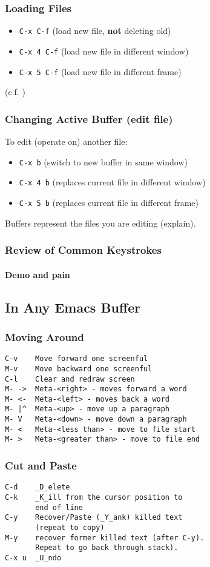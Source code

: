 \documentclass{beamer}
\begin{document}
\begin{frame}[fragile]
  \frametitle{Loading Files}
  \label{keystrokes:fileloading}
  \begin{itemize}
  \item \verb+C-x C-f+    (load new file, \textbf{not} deleting old)
  \item \verb+C-x 4 C-f+  (load new file in different window)
  \item \verb+C-x 5 C-f+  (load new file in different frame)
  \end{itemize}
  (c.f. \hyperlink{emacs:basics}{})
\end{frame}

\begin{frame}[fragile]
  \frametitle{Changing Active Buffer (edit file)}
  To edit (operate on) another file:
  \begin{itemize}
  \item \verb+C-x b+    (switch to new buffer in same window)
  \item \verb+C-x 4 b+  (replaces current file in different window)
  \item \verb+C-x 5 b+  (replaces current file in different frame)
  \end{itemize}
  Buffers represent the files you are editing (explain).
\end{frame}

\begin{frame}
  \frametitle{Review of Common Keystrokes}
  \framesubtitle{Demo and pain}
\end{frame}


\subsection{In Any Emacs Buffer}

\begin{frame}[fragile] \frametitle{Moving Around}
\begin{verbatim}
C-v    Move forward one screenful
M-v    Move backward one screenful
C-l    Clear and redraw screen
M- ->  Meta-<right> - moves forward a word 
M- <-  Meta-<left> - moves back a word
M- |^  Meta-<up> - move up a paragraph
M- V   Meta-<down> - move down a paragraph
M- <   Meta-<less than> - move to file start
M- >   Meta-<greater than> - move to file end
\end{verbatim}
\end{frame}

\begin{frame}[fragile] \frametitle{Cut and Paste}
\begin{verbatim}
C-d    _D_elete
C-k    _K_ill from the cursor position to
       end of line
C-y    Recover/Paste (_Y_ank) killed text 
       (repeat to copy) 
M-y    recover former killed text (after C-y).
       Repeat to go back through stack).
C-x u  _U_ndo
\end{verbatim}
\end{frame}
\end{document}
